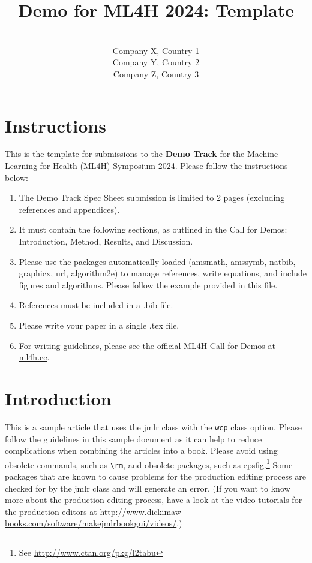 \documentclass[pmlr,twocolumn,10pt]{jmlr} %
\title[Short Title]{Demo for ML4H 2024: Template}
\author{%
\Name{First Author 1}\equal{These authors contributed equally} \Email{abc@sample.com}\\
\addr Company X, Country 1
\AND
\Name{First Author 2}\footnotemark[1] \Email{def@sample.com}\\
\addr Company Y, Country 2
\AND
\Name{Last Author} \Email{ghi@sample.com}\\
\addr Company Z, Country 3
}
\begin{document}
\maketitle


\section{Instructions}

This is the template for submissions to the \textbf{Demo Track} for the Machine Learning for Health (ML4H) Symposium 2024.
Please follow the instructions below:

\begin{enumerate}
    \item The Demo Track Spec Sheet submission is limited to 2 pages (excluding references and appendices). 
    \item It must contain the following sections, as outlined in the Call for Demos: Introduction, Method, Results, and Discussion.
    \item Please use the packages automatically loaded (amsmath, amssymb, natbib, graphicx, url, algorithm2e) to manage references, write equations, and include figures and algorithms. Please follow the example provided in this file.
    \item References must be included in a .bib file.
    \item Please write your paper in a single .tex file.
    \item For writing guidelines, please see the official ML4H Call for Demos at \url{ml4h.cc}.
\end{enumerate}

\newpage

\section{Introduction}
\label{sec:intro}

This is a sample article that uses the \textsf{jmlr} class with
the \texttt{wcp} class option.  Please follow the guidelines in
this sample document as it can help to reduce complications when
combining the articles into a book. Please avoid using obsolete
commands, such as \verb|\rm|, and obsolete packages, such as
\textsf{epsfig}.\footnote{See
\url{http://www.ctan.org/pkg/l2tabu}} Some packages that are known
to cause problems for the production editing process are checked for
by the \textsf{jmlr} class and will generate an error. (If you want
to know more about the production editing process, have a look at
the video tutorials for the production editors at
\url{http://www.dickimaw-books.com/software/makejmlrbookgui/videos/}.)
\end{document}
